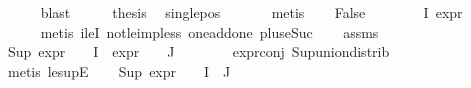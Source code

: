 \begin{isabellebody}
\ \ \ \ \isamarkupfalse%
\ blast\isanewline
\ \ \isamarkupfalse%
\ \isamarkupfalse%
\ {\isacharquery}{\kern0pt}thesis\ \isamarkupfalse%
\ single{\isacharunderscore}{\kern0pt}pos{\isacharunderscore}{\kern0pt}{\isasymchi}\ \isanewline
\ \ \ \ \isamarkupfalse%
\ metis\isanewline
{}\isamarkupfalse%
\isanewline
\ \ \isamarkupfalse%
\ False\isanewline
\ \ \isamarkupfalse%
\ {\isachardoublequoteopen}{\isasymforall}{\isasymphi}\ {\isasymin}\ {\isasymPhi}\ {\isacharbackquote}{\kern0pt}\ I{\isachardot}{\kern0pt}\ expr{\isacharunderscore}{\kern0pt}{}\ {\isasymphi}\ {\isasymle}\ {}{\isachardoublequoteclose}\isanewline
\ \ \ \ \isamarkupfalse%
\ {\isacharparenleft}{\kern0pt}metis\ ileI{}\ not{\isacharunderscore}{\kern0pt}le{\isacharunderscore}{\kern0pt}imp{\isacharunderscore}{\kern0pt}less\ one{\isacharunderscore}{\kern0pt}add{\isacharunderscore}{\kern0pt}one\ plus{\isacharunderscore}{\kern0pt}{}{\isacharunderscore}{\kern0pt}eSuc{\isacharparenleft}{\kern0pt}{}{\isacharparenright}{\kern0pt}{\isacharparenright}{\kern0pt}\isanewline
\ \ \isamarkupfalse%
\ assms\ \isamarkupfalse%
\ {\isachardoublequoteopen}{\isacharparenleft}{\kern0pt}Sup\ {\isacharparenleft}{\kern0pt}{\isacharparenleft}{\kern0pt}expr{\isacharunderscore}{\kern0pt}{}\ {\isasymcirc}\ {\isasymPhi}{\isacharparenright}{\kern0pt}\ {\isacharbackquote}{\kern0pt}\ I\ {\isasymunion}\ {\isacharparenleft}{\kern0pt}expr{\isacharunderscore}{\kern0pt}{}\ {\isasymcirc}\ {\isasymPhi}{\isacharparenright}{\kern0pt}\ {\isacharbackquote}{\kern0pt}\ J{\isacharparenright}{\kern0pt}{\isacharparenright}{\kern0pt}\ {\isasymle}\ {}{\isachardoublequoteclose}\isanewline
\ \ \ \ \isamarkupfalse%
\ expr{\isacharunderscore}{\kern0pt}{}{\isacharunderscore}{\kern0pt}conj\ Sup{\isacharunderscore}{\kern0pt}union{\isacharunderscore}{\kern0pt}distrib\ \isanewline
\ \ \ \ \isamarkupfalse%
\ {\isacharparenleft}{\kern0pt}metis\ le{\isacharunderscore}{\kern0pt}supE{\isacharparenright}{\kern0pt}\isanewline
\ \ \isamarkupfalse%
\ {\isachardoublequoteopen}Sup\ {\isacharparenleft}{\kern0pt}{\isacharparenleft}{\kern0pt}expr{\isacharunderscore}{\kern0pt}{}\ {\isasymcirc}\ {\isasymPhi}{\isacharparenright}{\kern0pt}\ {\isacharbackquote}{\kern0pt}\ {\isacharparenleft}{\kern0pt}I\ {\isasymunion}\ J{\isacharparenright}{\kern0pt}{\isacharparenright}{\kern0pt}\ {\isasymle}\ {}{\isachardoublequoteclose}\isanewline

\end{isabellebody}
